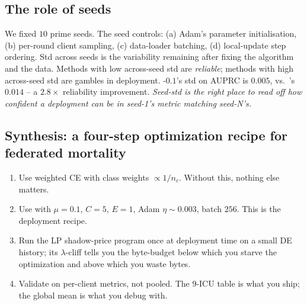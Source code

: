 \subsection{The role of seeds}
We fixed $10$ prime seeds. The seed controls: (a) Adam's parameter
initialisation, (b) per-round client sampling, (c) data-loader batching, (d)
local-update step ordering. Std across seeds is the variability remaining
after fixing the algorithm and the data. Methods with low across-seed std are
\emph{reliable}; methods with high across-seed std are gambles in deployment.
\fedprox{}-$0.1$'s std on AUPRC is $0.005$, vs.\ \fedavg{}'s $0.014$ -- a
$2.8\!\times$ reliability improvement. \emph{Seed-std is the right place to read
off how confident a deployment can be in seed-1's metric matching seed-N's.}

\subsection{Synthesis: a four-step optimization recipe for federated mortality}
\begin{enumerate}[leftmargin=*,nosep]
    \item Use weighted CE with class weights $\propto 1/n_c$. Without this,
        nothing else matters.
    \item Use \fedprox{} with $\mu \!=\! 0.1$, $C \!=\! 5$, $E\!=\!1$, Adam
        $\eta \!\sim\! 0.003$, batch $256$. This is the deployment recipe.
    \item Run the LP shadow-price program once at deployment time on a small
        DE history; its $\lambda$-cliff tells you the byte-budget below which
        you starve the optimization and above which you waste bytes.
    \item Validate on per-client metrics, not pooled. The $9$-ICU table is
        what you ship; the global mean is what you debug with.
\end{enumerate}
